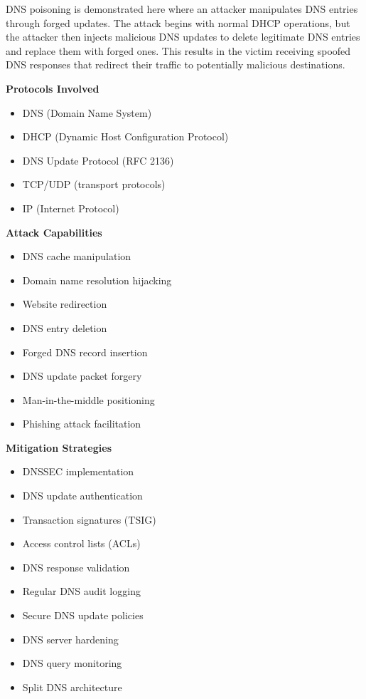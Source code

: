 DNS poisoning is demonstrated here where an attacker manipulates DNS entries through forged updates. The attack begins with normal DHCP operations, but the attacker then injects malicious DNS updates to delete legitimate DNS entries and replace them with forged ones. This results in the victim receiving spoofed DNS responses that redirect their traffic to potentially malicious destinations.

\textbf{Protocols Involved}
\begin{itemize}
    \item DNS (Domain Name System)
    \item DHCP (Dynamic Host Configuration Protocol)
    \item DNS Update Protocol (RFC 2136)
    \item TCP/UDP (transport protocols)
    \item IP (Internet Protocol)
\end{itemize}

\textbf{Attack Capabilities}
\begin{itemize}
    \item DNS cache manipulation
    \item Domain name resolution hijacking
    \item Website redirection
    \item DNS entry deletion
    \item Forged DNS record insertion
    \item DNS update packet forgery
    \item Man-in-the-middle positioning
    \item Phishing attack facilitation
\end{itemize}

\textbf{Mitigation Strategies}
\begin{itemize}
    \item DNSSEC implementation
    \item DNS update authentication
    \item Transaction signatures (TSIG)
    \item Access control lists (ACLs)
    \item DNS response validation
    \item Regular DNS audit logging
    \item Secure DNS update policies
    \item DNS server hardening
    \item DNS query monitoring
    \item Split DNS architecture
\end{itemize}

